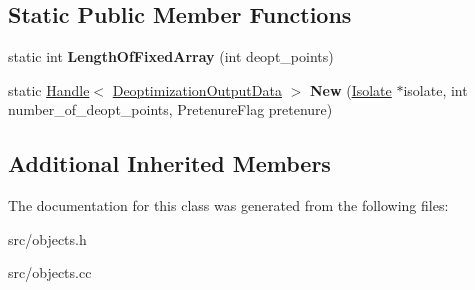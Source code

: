 \subsection*{Static Public Member Functions}
\begin{DoxyCompactItemize}
\item 
\hypertarget{classv8_1_1internal_1_1_deoptimization_output_data_aa706aa8c56eb61a7df6bed0379bf2021}{}static int {\bfseries Length\+Of\+Fixed\+Array} (int deopt\+\_\+points)\label{classv8_1_1internal_1_1_deoptimization_output_data_aa706aa8c56eb61a7df6bed0379bf2021}

\item 
\hypertarget{classv8_1_1internal_1_1_deoptimization_output_data_aff5aa51b25b9b9d419acd8d6e777c7f0}{}static \hyperlink{classv8_1_1internal_1_1_handle}{Handle}$<$ \hyperlink{classv8_1_1internal_1_1_deoptimization_output_data}{Deoptimization\+Output\+Data} $>$ {\bfseries New} (\hyperlink{classv8_1_1internal_1_1_isolate}{Isolate} $\ast$isolate, int number\+\_\+of\+\_\+deopt\+\_\+points, Pretenure\+Flag pretenure)\label{classv8_1_1internal_1_1_deoptimization_output_data_aff5aa51b25b9b9d419acd8d6e777c7f0}

\end{DoxyCompactItemize}
\subsection*{Additional Inherited Members}


The documentation for this class was generated from the following files\+:\begin{DoxyCompactItemize}
\item 
src/objects.\+h\item 
src/objects.\+cc\end{DoxyCompactItemize}
